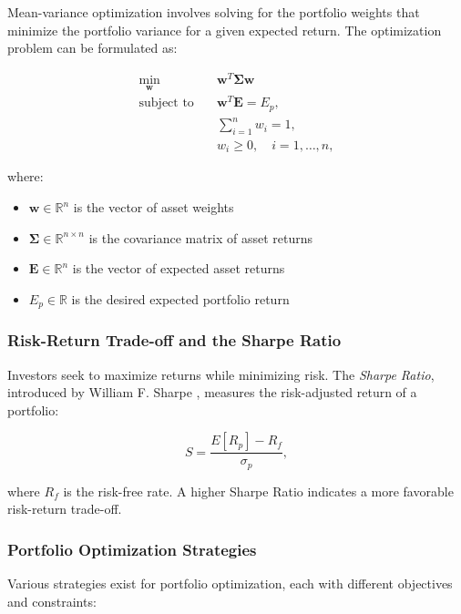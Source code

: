 Mean-variance optimization involves solving for the portfolio weights that minimize the portfolio variance for a given expected return. The optimization problem can be formulated as:

\begin{equation}
\begin{aligned}
    \min_{\mathbf{w}} \quad & \mathbf{w}^T \boldsymbol{\Sigma} \mathbf{w} \\[1ex]
    \text{subject to} \quad & \mathbf{w}^T \mathbf{E} = E_p, \\[1ex]
    & \sum_{i=1}^{n} w_i = 1, \\[1ex]
    & w_i \geq 0, \quad i = 1,\ldots,n,
\end{aligned}
\end{equation}

where:
\begin{itemize}
    \item $\mathbf{w} \in \mathbb{R}^n$ is the vector of asset weights
    \item $\boldsymbol{\Sigma} \in \mathbb{R}^{n \times n}$ is the covariance matrix of asset returns
    \item $\mathbf{E} \in \mathbb{R}^n$ is the vector of expected asset returns
    \item $E_p \in \mathbb{R}$ is the desired expected portfolio return
\end{itemize}
\subsubsection{Risk-Return Trade-off and the Sharpe Ratio}

Investors seek to maximize returns while minimizing risk. The \textit{Sharpe Ratio}, introduced by William F. Sharpe \cite{sharpe1964capital}, measures the risk-adjusted return of a portfolio:

\begin{equation}
    S = \frac{E[R_p] - R_f}{\sigma_p},
\end{equation}

where $R_f$ is the risk-free rate. A higher Sharpe Ratio indicates a more favorable risk-return trade-off.

\subsubsection{Portfolio Optimization Strategies}

Various strategies exist for portfolio optimization, each with different objectives and constraints:

